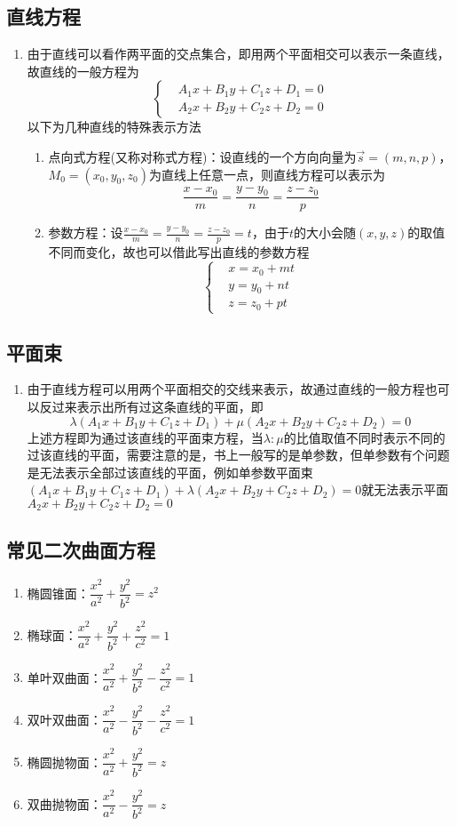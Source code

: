 \documentclass[12pt,a4paper,UTF8]{book}
\begin{document}
\subsection{直线方程}
\begin{enumerate}
\item 由于直线可以看作两平面的交点集合，即用两个平面相交可以表示一条直线，故直线的一般方程为
\[\left\{\begin{aligned}&A_1x+B_1y+C_1z+D_1=0\\&A_2x+B_2y+C_2z+D_2=0\end{aligned}\right.\]
以下为几种直线的特殊表示方法
\begin{enumerate}
\item 点向式方程(又称对称式方程)：设直线的一个方向向量为$\vec{s}=\left(m,n,p\right)$，$M_0=\left(x_0,y_0,z_0\right)$为直线上任意一点，则直线方程可以表示为
\[\frac{x-x_0}{m}=\frac{y-y_0}{n}=\frac{z-z_0}{p}\]
\item 参数方程：设$\frac{x-x_0}{m}=\frac{y-y_0}{n}=\frac{z-z_0}{p}=t$，由于$t$的大小会随$\left(x,y,z\right)$的取值不同而变化，故也可以借此写出直线的参数方程
\[\left\{\begin{aligned}&x=x_0+mt\\&y=y_0+nt\\&z=z_0+pt\end{aligned}\right.\]
\end{enumerate}
\end{enumerate}

\subsection{平面束}
\begin{enumerate}
\item 由于直线方程可以用两个平面相交的交线来表示，故通过直线的一般方程也可以反过来表示出所有过这条直线的平面，即
\[\lambda\left(A_1x+B_1y+C_1z+D_1\right)+\mu\left(A_2x+B_2y+C_2z+D_2\right)=0\]
上述方程即为通过该直线的平面束方程，当$\lambda:\mu$的比值取值不同时表示不同的过该直线的平面，需要注意的是，书上一般写的是单参数，但单参数有个问题是无法表示全部过该直线的平面，例如单参数平面束$\left(A_1x+B_1y+C_1z+D_1\right)+\lambda\left(A_2x+B_2y+C_2z+D_2\right)=0$就无法表示平面$A_2x+B_2y+C_2z+D_2=0$
\end{enumerate}

\subsection{常见二次曲面方程}
\begin{enumerate}
\item 椭圆锥面：$\dfrac{x^2}{a^2}+\dfrac{y^2}{b^2}=z^2$
\item 椭球面：$\dfrac{x^2}{a^2}+\dfrac{y^2}{b^2}+\dfrac{z^2}{c^2}=1$
\item 单叶双曲面：$\dfrac{x^2}{a^2}+\dfrac{y^2}{b^2}-\dfrac{z^2}{c^2}=1$
\item 双叶双曲面：$\dfrac{x^2}{a^2}-\dfrac{y^2}{b^2}-\dfrac{z^2}{c^2}=1$
\item 椭圆抛物面：$\dfrac{x^2}{a^2}+\dfrac{y^2}{b^2}=z$
\item 双曲抛物面：$\dfrac{x^2}{a^2}-\dfrac{y^2}{b^2}=z$
\end{enumerate}
\end{document}
